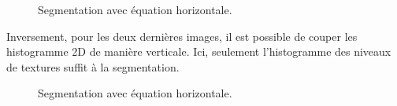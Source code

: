 \documentclass[11pt]{article}
\begin{document}
  \begin{figure}[H]
    \center
    \caption{Segmentation avec équation horizontale.}
  \end{figure}
  
  Inversement, pour les deux dernières images, il est possible de couper les histogramme 2D de manière 
  verticale. Ici, seulement l'histogramme des niveaux de textures suffit à la segmentation.
  
  \begin{figure}[H]
    \center
    \caption{Segmentation avec équation horizontale.}
  \end{figure}
  
\end{document}
